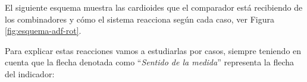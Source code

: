  \begin{figure}[!h]
    \centering {}
    \caption{}
  \end{figure}



El siguiente esquema muestra las cardioides que el comparador est\'a recibiendo de los combinadores y c\'omo el sistema reacciona seg\'un cada caso, ver Figura \ref{fig:esquema-adf-rot}.


Para explicar estas reacciones vamos a estudiarlas por casos, siempre teniendo en cuenta que la flecha denotada como ``\emph{Sentido de la medida}'' representa la flecha del indicador:

